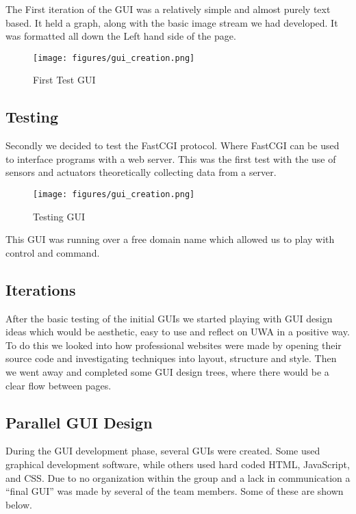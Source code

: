 The First iteration of the GUI was a relatively simple and almost purely text based. It held a graph, along with the basic image stream we had developed.  It was formatted all down the Left hand side of the page.

\begin{figure}[H]
	\centering
	\texttt{[image: figures/gui\_creation.png]}
	\caption{First Test GUI} 

\end{figure}

\subsection{Testing}

Secondly we decided to test the FastCGI protocol. Where FastCGI can be used to interface programs with a web server.  This was the first test with the use of sensors and actuators theoretically collecting data from a server.

\begin{figure}[H]
	\centering
	\texttt{[image: figures/gui\_creation.png]}
	\caption{Testing GUI} 

\end{figure}

This GUI was running over a free domain name which allowed us to play with control and command. 

\subsection{Iterations}

After the basic testing of the initial GUIs we started playing with GUI design ideas which would be aesthetic, easy to use and reflect on UWA in a positive way.  To do this we looked into how professional websites were made by opening their source code and investigating techniques into layout, structure and style. Then we went away and completed some GUI design trees, where there would be a clear flow between pages.  

\subsection{Parallel GUI Design}

During the GUI development phase, several GUIs were created. Some used graphical development software, while others used hard coded HTML, JavaScript, and CSS.  Due to no organization within the group and a lack in communication a ``final GUI'' was made by several of the team members.  Some of these are shown below.

